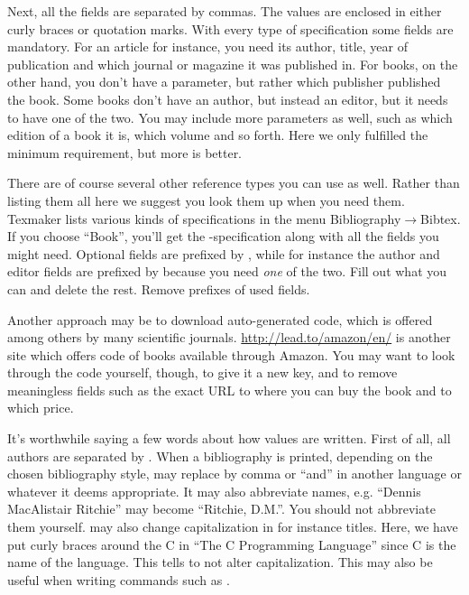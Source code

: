 {Next, all the fields are separated by commas. The values are enclosed in either curly braces or quotation marks. With every type of specification some fields are mandatory. For an article for instance, you need its author, title, year of publication and which journal or magazine it was published in. For books, on the other hand, you don't have a  parameter, but rather which publisher published the book. Some books don't have an author, but instead an editor, but it needs to have one of the two. You may include more parameters as well, such as which edition of a book it is, which volume and so forth. Here we only fulfilled the minimum requirement, but more is better.

There are of course several other reference types you can use as well. Rather than listing them all here we suggest you look them up when you need them. Texmaker lists various kinds of specifications in the menu Bibliography$\rightarrow$Bibtex. If you choose ``Book'', you'll get the -specification along with all the fields you might need. Optional fields are prefixed by , while for instance the author and editor fields are prefixed by  because you need \emph{one} of the two. Fill out what you can and delete the rest. Remove prefixes of used fields.

Another approach may be to download auto-generated \bibtex{} code, which is offered among others by many scientific journals. \url{http://lead.to/amazon/en/} is another site which offers \bibtex{} code of books available through Amazon. You may want to look through the code yourself, though, to give it a new key, and to remove meaningless fields such as the exact URL to where you can buy the book and to which price.

It's worthwhile saying a few words about how values are written. First of all, all authors are separated by . When a bibliography is printed, depending on the chosen bibliography style, \bibtex{} may replace  by comma or ``and'' in another language or whatever it deems appropriate. It may also abbreviate names, e.g. ``Dennis MacAlistair Ritchie'' may become ``Ritchie, D.M.''. You should not abbreviate them yourself. \bibtex{} may also change capitalization in for instance titles. Here, we have put curly braces around the C in ``The C Programming Language'' since C is the name of the language. This tells \bibtex{} to not alter capitalization. This may also be useful when writing commands such as \latexin{\LaTeX}.

}
